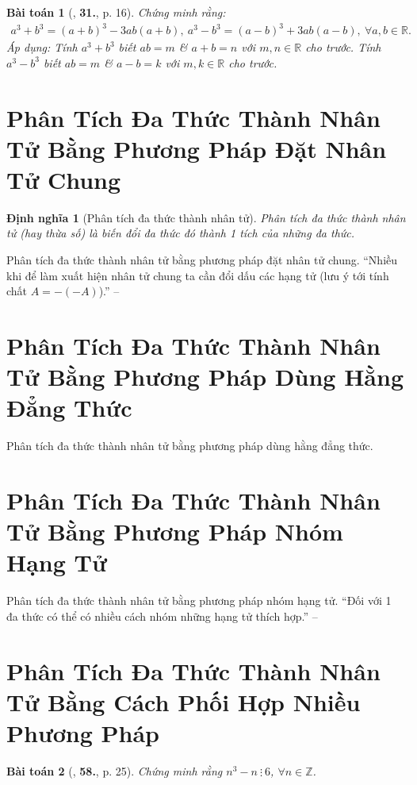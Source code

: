 \documentclass[oneside]{book}
\numberwithin{equation}{section}
\newtheorem{dinhnghia}{Định nghĩa}[section]
\newtheorem{baitoan}{Bài toán}[section]
\begin{document}
\begin{baitoan}[\cite{SGK_Toan_8_tap_1}, \textbf{31.}, p. 16]
	Chứng minh rằng:
	\begin{align*}
		a^3 + b^3 = (a + b)^3 - 3ab(a + b),\ a^3 - b^3 = (a - b)^3 + 3ab(a - b),\ \forall a,b\in\mathbb{R}.
	\end{align*}
	Áp dụng: Tính $a^3 + b^3$ biết $ab = m$ \& $a + b = n$ với $m,n\in\mathbb{R}$ cho trước. Tính $a^3 - b^3$ biết $ab = m$ \& $a - b = k$ với $m,k\in\mathbb{R}$ cho trước.
\end{baitoan}

\section{Phân Tích Đa Thức Thành Nhân Tử Bằng Phương Pháp Đặt Nhân Tử Chung}

\begin{dinhnghia}[Phân tích đa thức thành nhân tử]
	\emph{Phân tích đa thức thành nhân tử (hay thừa số)} là biến đổi đa thức đó thành 1 tích của những đa thức.	
\end{dinhnghia}
Phân tích đa thức thành nhân tử bằng phương pháp đặt nhân tử chung. ``Nhiều khi để làm xuất hiện nhân tử chung ta cần đổi dấu các hạng tử (lưu ý tới tính chất $A = -(-A)$).'' -- \cite[p. 18]{SGK_Toan_8_tap_1}

\section{Phân Tích Đa Thức Thành Nhân Tử Bằng Phương Pháp Dùng Hằng Đẳng Thức}
Phân tích đa thức thành nhân tử bằng phương pháp dùng hằng đẳng thức.

\section{Phân Tích Đa Thức Thành Nhân Tử Bằng Phương Pháp Nhóm Hạng Tử}
Phân tích đa thức thành nhân tử bằng phương pháp nhóm hạng tử. ``Đối với 1 đa thức có thể có nhiều cách nhóm những hạng tử thích hợp.'' -- \cite[p. 21]{SGK_Toan_8_tap_1}

\section{Phân Tích Đa Thức Thành Nhân Tử Bằng Cách Phối Hợp Nhiều Phương Pháp}

\begin{baitoan}[\cite{SGK_Toan_8_tap_1}, \textbf{58.}, p. 25]
	Chứng minh rằng $n^3 - n\ \vdots\ 6$, $\forall n\in\mathbb{Z}$.
\end{baitoan}
\end{document}

